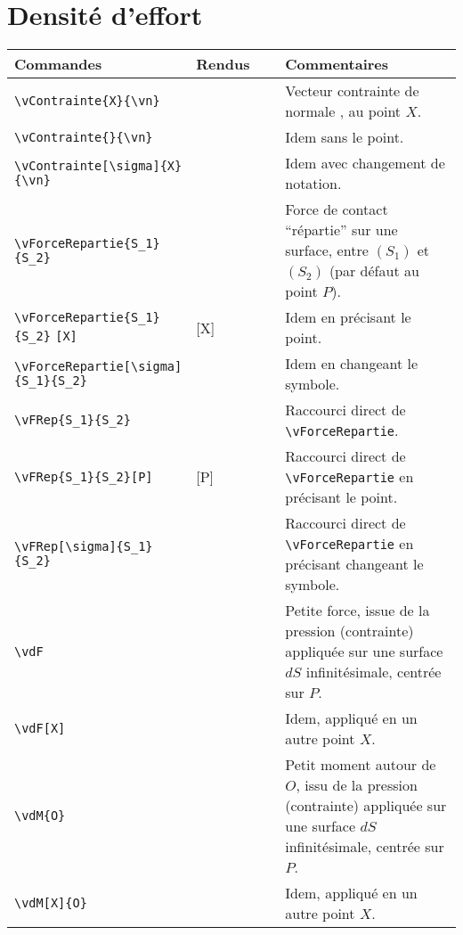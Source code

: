 \documentclass[a4paper,12pt]{article}
\begin{document}
	\section{Densité d'effort}
		\noindent
		\begin{tabular}{|p{0.4\linewidth}|p{0.2\linewidth}|p{0.4\linewidth}|}
			\hline
				\textbf{Commandes}&\textbf{Rendus}&\textbf{Commentaires}
			\\\hline\hline
				\verb!\vContrainte{X}{\vn}! 			&	\vContrainte{X}{\vn}		&	Vecteur contrainte de normale \vn, au point $X$.
			\\\hline
				\verb!\vContrainte{}{\vn}!				&	\vContrainte{}{\vn}		&	Idem sans le point.
			\\\hline
				\verb!\vContrainte[\sigma]{X}! \verb!{\vn}!		&	\vContrainte[\sigma]{X}{\vn}	&	Idem avec changement de notation.
			\\\hline
				\verb!\vForceRepartie{S_1}{S_2}!			&	\vForceRepartie{S_1}{S_2}		&	Force de contact ``répartie'' sur une surface, entre $(S_1)$ et $(S_2)$ (par défaut au point $P$).
			\\\hline
				\verb!\vForceRepartie{S_1}{S_2}! \verb![X]!		&	\vForceRepartie{S_1}{S_2}[X]		&	Idem en précisant le point.
			\\\hline
				\verb!\vForceRepartie[\sigma]! \verb!{S_1}{S_2}!		&	\vForceRepartie[\sigma]{S_1}{S_2}	&	Idem en changeant le symbole.
			\\\hline
				\verb!\vFRep{S_1}{S_2}!					&	\vFRep{S_1}{S_2}			&	Raccourci direct de \verb!\vForceRepartie!.
			\\\hline
				\verb!\vFRep{S_1}{S_2}[P]!				&	\vFRep{S_1}{S_2}[P]			&	Raccourci direct de \verb!\vForceRepartie! en précisant le point.
			\\\hline
				\verb!\vFRep[\sigma]{S_1}{S_2}!				&	\vFRep[\sigma]{S_1}{S_2}		&	Raccourci direct de \verb!\vForceRepartie! en précisant changeant le symbole.
			\\\hline
				\verb!\vdF!						&	\vdF					&	Petite force, issue de la pression (contrainte) appliquée sur une surface $dS$ infinitésimale, centrée sur $P$.
			\\\hline
				\verb!\vdF[X]!						&	\vdF[X]					&	Idem, appliqué en un autre point $X$.
			\\\hline
				\verb!\vdM{O}!						&	\vdM{O}					&	Petit moment autour de $O$, issu de la pression (contrainte) appliquée sur une surface $dS$ infinitésimale, centrée sur $P$.
			\\\hline
				\verb!\vdM[X]{O}!					&	\vdM[X]{O}				&	Idem, appliqué en un autre point $X$.

\end{tabular}
\end{document}
